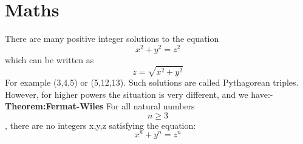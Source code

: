 \documentclass[a4paper]{article}
\begin{document}
\section{Maths}
There are many positive integer solutions to the equation 
\[x^2+y^2=z^2\]
which can be written as
\[z=\sqrt{x^2+y^2}\]
For example (3,4,5) or (5,12,13). Such solutions are called Pythagorean triples.
However, for higher powers the situation is very different, and we have:-
\textbf{Theorem:Fermat-Wiles} 
For all natural numbers \[n\geq3\], there are no integers x,y,z satisfying the equation:
\[x^n+y^n=z^n\]
\end{document}
